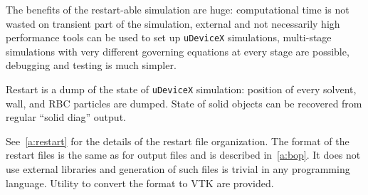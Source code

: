 The benefits of the restart-able simulation are huge: computational
time is not wasted on transient part of the simulation, external and
not necessarily high performance tools can be used to
set up \texttt{uDeviceX} simulations, multi-stage simulations with very
different governing equations at every stage are possible, debugging and
testing is much simpler.

Restart is a dump of the state of \texttt{uDeviceX} simulation:
position of every solvent, wall, and RBC particles are dumped. State
of solid objects can be recovered from regular ``solid diag'' output.

See~\ref{a:restart} for the details of the restart file
organization. The format of the restart files is the same as for
output files and is described in~\ref{a:bop}. It does not use external
libraries and generation of such files is trivial in any programming
language. Utility to convert the format to VTK are provided.
